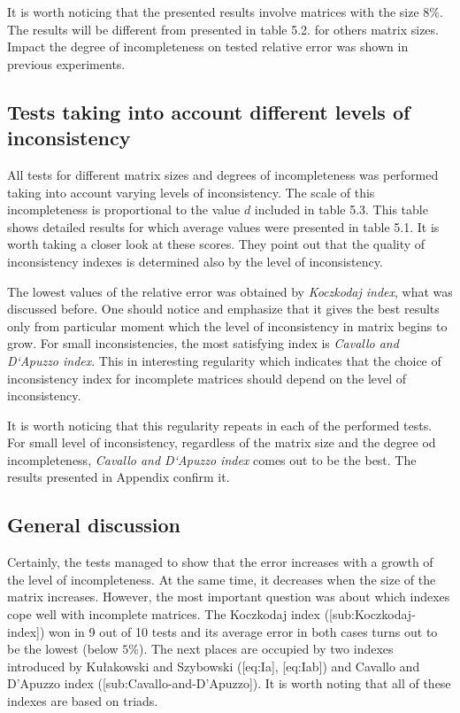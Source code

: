 It is worth noticing that the presented results involve matrices with the size $8\%$. The results will be different from presented in table 5.2. for others matrix sizes. Impact the degree of incompleteness on tested relative error was shown in previous experiments.

\subsection{Tests taking into account different levels of inconsistency}
All tests for different matrix sizes and degrees of incompleteness was performed taking into account varying levels of inconsistency. The scale of this incompleteness is proportional to the value $d$ included in table 5.3. This table shows detailed results for which average values were presented in table 5.1. It is worth taking a closer look at these scores. They point out that the quality of inconsistency indexes is determined also by the level of inconsistency.

The lowest values of the relative error was obtained by \textit{Koczkodaj index}, what was discussed before. One should notice and emphasize that it gives the best results only from particular moment which the level of inconsistency in matrix begins to grow. For small inconsistencies, the most satisfying index is \textit{Cavallo and D`Apuzzo index}. This in interesting regularity which indicates that the choice of inconsistency index for incomplete matrices should depend on the level of inconsistency. 

It is worth noticing that this regularity repeats in each of the performed tests. For small level of inconsistency, regardless of the matrix size and the degree od incompleteness, \textit{Cavallo and D`Apuzzo index} comes out to be the best. The results presented in Appendix confirm it.

\subsection{General discussion}
Certainly, the tests managed to show that the error increases with a growth of the level of incompleteness. At the same time, it decreases when the size of the matrix increases. However, the most important question was about which indexes cope well with incomplete matrices. The Koczkodaj index ([sub:Koczkodaj-index]) won in 9 out of 10 tests and its average error in both cases turns out to be the lowest (below $5\%$). The next places are occupied by two indexes introduced by Kułakowski and Szybowski ([eq:Ia], [eq:Iab]) and Cavallo and D'Apuzzo index ([sub:Cavallo-and-D’Apuzzo]). It is worth noting that all of these indexes are based on triads.

